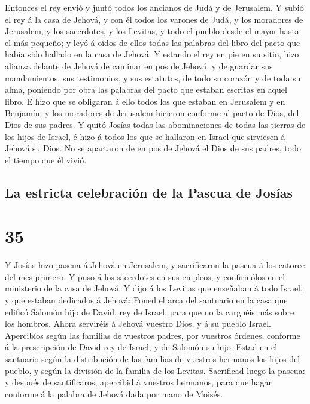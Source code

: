  Entonces el rey envió y juntó todos los ancianos de Judá
y de Jerusalem.  Y subió el rey á la casa de Jehová, y
con él todos los varones de Judá, y los moradores de Jerusalem, y los
sacerdotes, y los Levitas, y todo el pueblo desde el mayor hasta el más
pequeño; y leyó á oídos de ellos todas las palabras del libro del pacto
que había sido hallado en la casa de Jehová.  Y estando
el rey en pie en su sitio, hizo alianza delante de Jehová de caminar en
pos de Jehová, y de guardar sus mandamientos, sus testimonios, y sus
estatutos, de todo su corazón y de toda su alma, poniendo por obra las
palabras del pacto que estaban escritas en aquel libro. 
E hizo que se obligaran á ello todos los que estaban en Jerusalem y en
Benjamín: y los moradores de Jerusalem hicieron conforme al pacto de
Dios, del Dios de sus padres.  Y quitó Josías todas las
abominaciones de todas las tierras de los hijos de Israel, é hizo á
todos los que se hallaron en Israel que sirviesen á Jehová su Dios. No
se apartaron de en pos de Jehová el Dios de sus padres, todo el tiempo
que él vivió.

\hypertarget{la-estricta-celebraciuxf3n-de-la-pascua-de-josuxedas}{%
\subsection{La estricta celebración de la Pascua de
Josías}\label{la-estricta-celebraciuxf3n-de-la-pascua-de-josuxedas}}

\hypertarget{section-34}{%
\section{35}\label{section-34}}

 Y Josías hizo pascua á Jehová en Jerusalem, y
sacrificaron la pascua á los catorce del mes primero.  Y
puso á los sacerdotes en sus empleos, y confirmólos en el ministerio de
la casa de Jehová.  Y dijo á los Levitas que enseñaban á
todo Israel, y que estaban dedicados á Jehová: Poned el arca del
santuario en la casa que edificó Salomón hijo de David, rey de Israel,
para que no la carguéis más sobre los hombros. Ahora serviréis á Jehová
vuestro Dios, y á su pueblo Israel.  Apercibíos según las
familias de vuestros padres, por vuestros órdenes, conforme á la
prescripción de David rey de Israel, y de Salomón su hijo.
 Estad en el santuario según la distribución de las
familias de vuestros hermanos los hijos del pueblo, y según la división
de la familia de los Levitas.  Sacrificad luego la pascua:
y después de santificaros, apercibid á vuestros hermanos, para que hagan
conforme á la palabra de Jehová dada por mano de Moisés.

